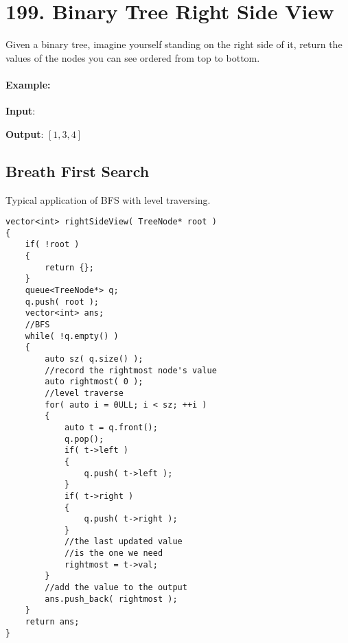 \section{199. Binary Tree Right Side View}
Given a binary tree, imagine yourself standing on the right side of it, return the values of the nodes you can see ordered from top to bottom.
\paragraph{Example:}
\begin{flushleft}
\textbf{Input}:
\begin{figure}[H]
\end{figure}
\textbf{Output}: $[1,3,4]$
\end{flushleft}
\subsection{Breath First Search}
Typical application of BFS with level traversing.
\begin{lstlisting}[style=customc, caption={BFS}]
vector<int> rightSideView( TreeNode* root )
{
    if( !root )
    {
        return {};
    }
    queue<TreeNode*> q;
    q.push( root );
    vector<int> ans;
	//BFS
    while( !q.empty() )
    {
        auto sz( q.size() );
		//record the rightmost node's value
        auto rightmost( 0 );
		//level traverse
        for( auto i = 0ULL; i < sz; ++i )
        {
            auto t = q.front();
            q.pop();
            if( t->left )
            {
                q.push( t->left );
            }
            if( t->right )
            {
                q.push( t->right );
            }
			//the last updated value
			//is the one we need
            rightmost = t->val;
        }
		//add the value to the output
        ans.push_back( rightmost );
    }
    return ans;
}

\end{lstlisting}